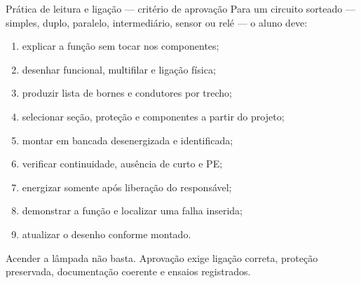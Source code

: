 \begin{frame}{Prática de leitura e ligação — critério de aprovação}
\small
Para um circuito sorteado — simples, duplo, paralelo, intermediário, sensor ou relé — o aluno deve:
\begin{enumerate}
\item explicar a função sem tocar nos componentes;
\item desenhar funcional, multifilar e ligação física;
\item produzir lista de bornes e condutores por trecho;
\item selecionar seção, proteção e componentes a partir do projeto;
\item montar em bancada desenergizada e identificada;
\item verificar continuidade, ausência de curto e PE;
\item energizar somente após liberação do responsável;
\item demonstrar a função e localizar uma falha inserida;
\item atualizar o desenho conforme montado.
\end{enumerate}
\begin{caixaAt}
Acender a lâmpada não basta. Aprovação exige ligação correta, proteção preservada, documentação coerente e ensaios registrados.
\end{caixaAt}
\end{frame}
